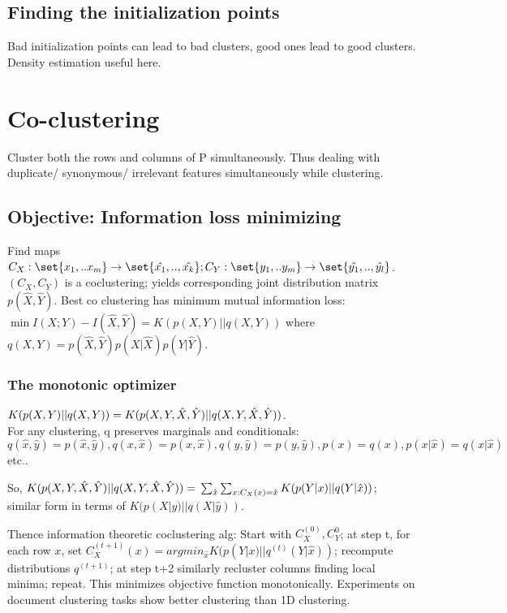 \documentclass[oneside, article]{memoir}
\begin{document}
\subsection{Finding the initialization points}
Bad initialization points can lead to bad clusters, good ones lead to good clusters. Density estimation useful here. \tbc



\section{Co-clustering}
Cluster both the rows and columns of P simultaneously. Thus dealing with duplicate/ synonymous/ irrelevant features simultaneously while clustering.

\subsection{Objective: Information loss minimizing}
Find maps $C_{X}: \set{x_{1}, .. x_{m}} \to \set{\hat{x_{1}}, .. , \hat{x_{k}}};\\
 C_{Y}: \set{y_{1}, .. y_{m}} \to \set{\hat{y_{1}}, .. , \hat{y_{l}}}$. $(C_{X}, C_{Y})$ is a coclustering; yields corresponding joint distribution matrix $p(\hat{X}, \hat{Y})$. Best co clustering has minimum mutual information loss: $\min I(X;Y) - I(\hat{X},\hat{Y}) = K(p(X,Y)||q(X,Y))$ where $q(X, Y) = p(\hat{X}, \hat{Y})p(X|\hat{X})p(Y|\hat{Y})$.

\subsubsection{The monotonic optimizer}
$K(p(X,Y)||q(X,Y)) = \\
K(p(X,Y,\hat{X},\hat{Y})||q(X,Y,\hat{X},\hat{Y}))$.\\
For any clustering, q preserves marginals and conditionals: \\
$q(\hat{x}, \hat{y}) = p(\hat{x}, \hat{y}), q(x, \hat{x}) = p(x, \hat{x}), q(y, \hat{y}) = p(y, \hat{y}), p(x) = q(x), p(x|\hat{x}) = q(x|\hat{x})$ etc..

So, $K(p(X,Y,\hat{X},\hat{Y})||q(X,Y,\hat{X},\hat{Y})) =\\
 \sum_{\hat{x}} \sum_{x : C_{X}(x) = \\
 \hat{x}} K(p(Y|x)||q(Y|\hat{x}))$; \\
 similar form in terms of $K(p(X|y)||q(X|\hat{y}))$.

Thence information theoretic coclustering alg: Start with $C_{X}^{(0)}, C_{Y}^{0}$; at step t, for each row $x$,  set $C_{X}^{(t+1)}(x)= argmin_{\hat{x}} K(p(Y|x)||q^{(t)}(Y|\hat{x}))$; recompute distributions $q^{(t+1)}$; at step t+2 similarly recluster columns finding local minima; repeat. This minimizes objective function monotonically. Experiments on document clustering tasks show better clustering than 1D clustering.
\end{document}
